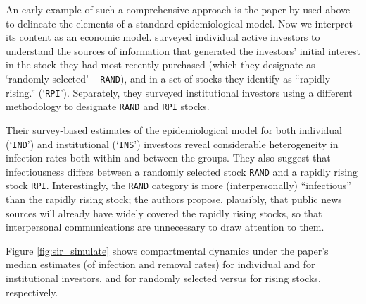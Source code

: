 An early example of such a comprehensive approach is the paper by \cite{shiller1989survey} used above to delineate the elements of a standard epidemiological model.  Now we interpret its content as an economic model.  \cite{shiller1989survey} surveyed individual active investors to understand the sources of information that generated the investors' initial interest in the stock they had most recently purchased (which they designate as `randomly selected' -- \texttt{RAND}), and in a set of stocks they identify as ``rapidly rising.'' (`\texttt{RPI}').  Separately, they surveyed institutional investors using a different methodology to designate \texttt{RAND} and \texttt{RPI} stocks. %

Their survey-based estimates of the epidemiological model for both individual (`\texttt{IND}') and institutional (`\texttt{INS}') investors reveal considerable heterogeneity in infection rates both within and between the groups. They also suggest that infectiousness differs between a randomly selected stock \texttt{RAND} and a rapidly rising stock \texttt{RPI}. Interestingly, the \texttt{RAND} category is more (interpersonally) ``infectious'' than the rapidly rising stock; the authors propose, plausibly, that public news sources will already have widely covered the rapidly rising stocks, so that interpersonal communications are unnecessary to draw attention to them.

Figure \ref{fig:sir_simulate} shows compartmental dynamics under the paper's median estimates (of infection and removal rates) for individual and for institutional investors, and for randomly selected versus for rising stocks, respectively.


